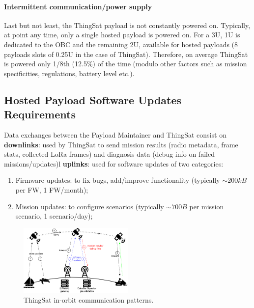 \paragraph*{Intermittent communication/power supply}
Last but not least, the ThingSat payload is not constantly powered on. Typically, at point any time,
only a single hosted payload is powered on. For a 3U, 1U is dedicated to the OBC
and the remaining 2U, available for hosted payloads (8 payloads slots of 0.25U
in the case of ThingSat). Therefore, on average ThingSat is powered only 1/8th (12.5\%) of the time
(modulo other factors such as mission specificities, regulations, battery level etc.).

\subsection{Hosted Payload Software Updates Requirements}
\label{sec:thingsat-update-req}
Data exchanges between the Payload Maintainer and ThingSat consist on
\textbf{downlinks}: used by ThingSat to send mission results (radio metadata, frame stats, collected LoRa frames)
and diagnosis data (debug info on failed missions/updates)l \textbf{uplinks}: used for software updates of two categories:
\begin{enumerate}
    \item Firmware updates: to fix bugs, add/improve functionality (typically $\sim 200kB$ per FW, 1 FW/month);
    \item Mission updates: to configure scenarios (typically $\sim 700B$ per mission scenario, 1 scenario/day);
\end{enumerate}

\begin{figure}[t]
    \centering
    \includegraphics[width=0.5\textwidth]{Figures/thingsat-dtn.png}
    \caption{ThingSat in-orbit communication patterns.}
    \label{fig:thingsat-comm}
\end{figure}
